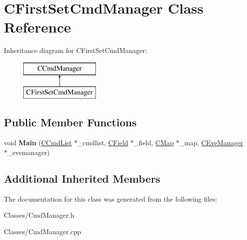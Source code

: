 \hypertarget{class_c_first_set_cmd_manager}{}\section{C\+First\+Set\+Cmd\+Manager Class Reference}
\label{class_c_first_set_cmd_manager}
Inheritance diagram for C\+First\+Set\+Cmd\+Manager\+:\begin{figure}[H]
\begin{center}
\leavevmode
\includegraphics[height=2.000000cm]{class_c_first_set_cmd_manager}
\end{center}
\end{figure}
\subsection*{Public Member Functions}
\begin{DoxyCompactItemize}
\item 
void {\bfseries Main} (\hyperlink{class_c_cmd_list}{C\+Cmd\+List} $\ast$\+\_\+cmdlist, \hyperlink{class_c_field}{C\+Field} $\ast$\+\_\+field, \hyperlink{class_c_map}{C\+Map} $\ast$\+\_\+map, \hyperlink{class_c_eve_manager}{C\+Eve\+Manager} $\ast$\+\_\+evemanager)\hypertarget{class_c_first_set_cmd_manager_ae71edefdb48f39d6e7138158585f4cbc}{}\label{class_c_first_set_cmd_manager_ae71edefdb48f39d6e7138158585f4cbc}

\end{DoxyCompactItemize}
\subsection*{Additional Inherited Members}


The documentation for this class was generated from the following files\+:\begin{DoxyCompactItemize}
\item 
Classes/Cmd\+Manager.\+h\item 
Classes/Cmd\+Manager.\+cpp\end{DoxyCompactItemize}
